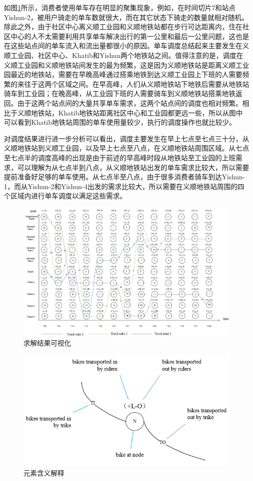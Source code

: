 \documentclass[]{tongjithesis}
\numberwithin{equation}{chapter}
\begin{document}
如图\ref{visualization}所示，消费者使用单车存在明显的聚集现象，例如，在时间切片7和站点Yishun-2，被用户骑走的单车数就很大，而在其它状态下骑走的数量就相对随机。除此之外，由于社区中心离义顺工业园和义顺地铁站都在步行可达距离内，住在社区中心的人不太需要利用共享单车解决出行的第一公里和最后一公里问题，这也是在这些站点间的单车流入和流出量都很小的原因。单车调度总结起来主要发生在义顺工业园、社区中心、Khatib和Yishun两个地铁站之间。值得注意的是，调度在义顺工业园和义顺地铁站间发生的最为频繁，这是因为义顺地铁站是距离义顺工业园最近的地铁站，需要在早晚高峰通过搭乘地铁到达义顺工业园上下班的人需要频繁的来往于这两个区域之间。在早高峰，人们从义顺地铁站下地铁后需要从地铁站骑车到工业园；在晚高峰，从工业园下班的人需要骑车到义顺地铁站搭乘地铁返回。由于这两个站点间的大量共享单车需求，这两个站点间的调度也相对频繁。相比于义顺地铁站，Khatib地铁站距离社区中心和工业园都更远一些，所以从图中可以看到Khatib地铁站周围的单车使用量较少，执行的调度操作也就比较少。

对调度结果进行进一步分析可以看出，调度主要发生在早上七点至七点三十分，从义顺地铁站到义顺工业园，以及早上七点至八点，在义顺地铁站周围区域。从七点至七点半的调度高峰的出现是由于前述的早高峰时段从地铁站至工业园的上班需求，可以理解为从七点半到八点，从义顺地铁站出发的单车需求比较大，所以需要提前准备好足够的单车使用。从七点半至八点，由于很多消费者骑车到达Yishun-1，而从Yishun-2和Yishun-4出发的需求比较大，所以需要在义顺地铁站周围的四个区域内进行单车调度以满足这些需求。

\begin{figure}[H]
    \centering
    \includegraphics[width=1.0 \textwidth]{figures_main/visualiza_solution_trike.png}
    \caption{求解结果可视化}
    \label{visualization}
\end{figure}

\begin{figure}[H]
    \centering
    \includegraphics[width=0.6 \textwidth]{figures_main/element_illustration.png}
    \caption{元素含义解释}
    \label{element_illus}
\end{figure}
\end{document}
